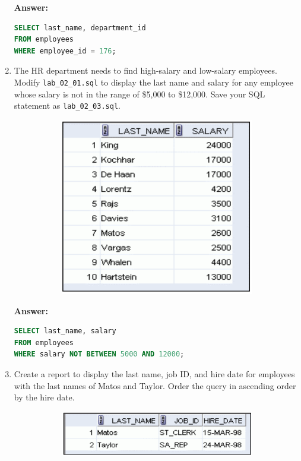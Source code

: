 \documentclass[a4paper,12pt]{article}
\begin{document}
\begin{enumerate}
    \textbf{Answer: }
    \begin{lstlisting}[language=SQL, label={lst:employees_data}]
SELECT last_name, department_id
FROM employees
WHERE employee_id = 176;
    \end{lstlisting}
    \item The HR department needs to find high-salary and low-salary employees. Modify
\texttt{lab\_02\_01.sql} to display the last name and salary for any employee whose salary is not in
the range of \$5,000 to \$12,000. Save your SQL statement as \texttt{lab\_02\_03.sql}.
\begin{figure}[h]
        \centering
        \begin{subfigure}[b]{0.35\linewidth}
            \centering
            \includegraphics[width=\linewidth]{graphics/23.png}
        \end{subfigure}
    \end{figure}        
    \newpage
    \textbf{Answer: }
    \begin{lstlisting}[language=SQL, label={lst:employees_data}]
SELECT last_name, salary
FROM employees
WHERE salary NOT BETWEEN 5000 AND 12000;
    \end{lstlisting}
    \item Create a report to display the last name, job ID, and hire date for employees with the last names
of Matos and Taylor. Order the query in ascending order by the hire date.
\begin{figure}[h]
        \centering
        \begin{subfigure}[b]{0.35\linewidth}
            \centering
            \includegraphics[width=\linewidth]{graphics/24.png}
        \end{subfigure}
    \end{figure}        
    

\end{enumerate}
\end{document}
